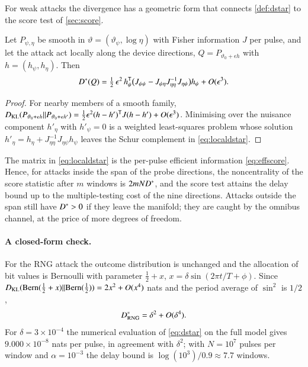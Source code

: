 For weak attacks the divergence has a geometric form that connects \cref{def:dstar} to the score test of \cref{sec:score}.

\begin{proposition}\label{prop:local}
Let $P_{\psi,\eta}$ be smooth in $\vartheta=(\vartheta_\psi,\log\eta)$ with Fisher information $J$ per pulse, and let the attack act locally along the device directions, $Q=P_{\vartheta_0+\epsilon h}$ with $h=(h_\psi,h_\eta)$. Then
\begin{equation}
D^{\ast}(Q)=\tfrac12\,\epsilon^2\,h_\psi^{\mathsf{T}}\bigl(J_{\psi\psi}-J_{\psi\eta}J_{\eta\eta}^{-1}J_{\eta\psi}\bigr)h_\psi+O(\epsilon^3). \label{eq:localdstar}
\end{equation}
\end{proposition}
\begin{proof}
For nearby members of a smooth family, $D_{\mathrm{KL}}(P_{\vartheta_0+\epsilon h}\Vert P_{\vartheta_0+\epsilon h'})=\tfrac12\epsilon^2(h-h')^{\mathsf{T}} J(h-h')+O(\epsilon^3)$. Minimising over the nuisance component $h'_\eta$ with $h'_\psi=0$ is a weighted least-squares problem whose solution $h'_\eta=h_\eta+J_{\eta\eta}^{-1}J_{\eta\psi}h_\psi$ leaves the Schur complement in \eqref{eq:localdstar}.
\end{proof}

The matrix in \cref{eq:localdstar} is the per-pulse efficient information \eqref{eq:effscore}. Hence, for attacks inside the span of the probe directions, the noncentrality of the score statistic after $m$ windows is $2mND^{\ast}$, and the score test attains the delay bound up to the multiple-testing cost of the nine directions. Attacks outside the span still have $D^{\ast}>0$ if they leave the manifold; they are caught by the omnibus channel, at the price of more degrees of freedom.

\paragraph{A closed-form check.} For the RNG attack the outcome distribution is unchanged and the allocation of bit values is Bernoulli with parameter $\tfrac12+x$, $x=\delta\sin(2\pi t/T+\phi)$. Since $D_{\mathrm{KL}}(\mathrm{Bern}(\tfrac12+x)\Vert\mathrm{Bern}(\tfrac12))=2x^2+O(x^4)$ nats and the period average of $\sin^2$ is $1/2$,
\begin{equation}
D^{\ast}_{\rm RNG}=\delta^2+O(\delta^4). \label{eq:rngdstar}
\end{equation}
For $\delta=3\times10^{-4}$ the numerical evaluation of \cref{eq:dstar} on the full model gives $9.000\times10^{-8}$ nats per pulse, in agreement with $\delta^2$; with $N=10^7$ pulses per window and $\alpha=10^{-3}$ the delay bound is $\log(10^3)/0.9\approx7.7$ windows.

